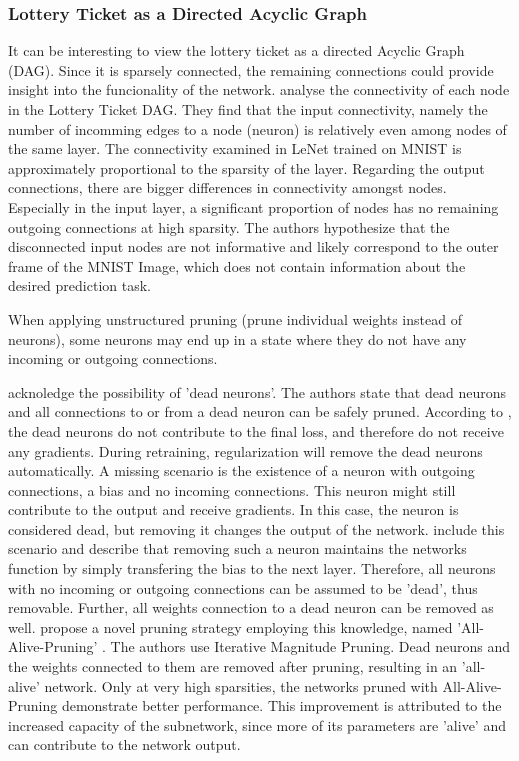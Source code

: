 \subsubsection{Lottery Ticket as a Directed Acyclic Graph}
It can be interesting to view the lottery ticket as a directed Acyclic Graph (DAG).
Since it is sparsely connected, the remaining connections could provide insight into the funcionality of the network.
\textcite{DBLP:conf/iclr/FrankleC19} analyse the connectivity of each node in the Lottery Ticket DAG.
They find that the input connectivity, namely the number of incomming edges to a node (neuron) is relatively even among nodes of the same layer.
The connectivity examined in LeNet trained on MNIST is approximately proportional to the sparsity of the layer.
Regarding the output connections, there are bigger differences in connectivity amongst nodes.
Especially in the input layer, a significant proportion of nodes has no remaining outgoing connections at high sparsity. 
The authors hypothesize that the disconnected input nodes are not informative and likely correspond to the outer frame of the MNIST Image, which does not contain information about the desired prediction task.

When applying unstructured pruning (prune individual weights instead of neurons), some neurons may end up in a state where they do not have any incoming or outgoing connections. 

\textcite{HanEtAl15} acknoledge the possibility of 'dead neurons'. 
The authors state that dead neurons and all connections to or from a dead neuron can be safely pruned.
According to \autocite{HanEtAl15}, the dead neurons do not contribute to the final loss, and therefore do not receive any gradients. 
During retraining, regularization will remove the dead neurons automatically. 
A missing scenario is the existence of a neuron with outgoing connections, a bias and no incoming connections. This neuron might still contribute to the output and receive gradients. 
In this case, the neuron is considered dead, but removing it changes the output of the network.
\textcite{AllAlivePruning} include this scenario and describe that removing such a neuron maintains the networks function by simply transfering the bias to the next layer. 
Therefore, all neurons with no incoming or outgoing connections can be assumed to be 'dead', thus removable. Further, all weights connection to a dead neuron can be removed as well.
\textcite{AllAlivePruning} propose a novel pruning strategy employing this knowledge, named 'All-Alive-Pruning' . 
The authors use Iterative Magnitude Pruning. Dead neurons and the weights connected to them are removed after pruning, resulting in an 'all-alive' network.
Only at very high sparsities, the networks pruned with All-Alive-Pruning demonstrate better performance. 
This improvement is attributed to the increased capacity of the subnetwork, since more of its parameters are 'alive' and can contribute to the network output.

